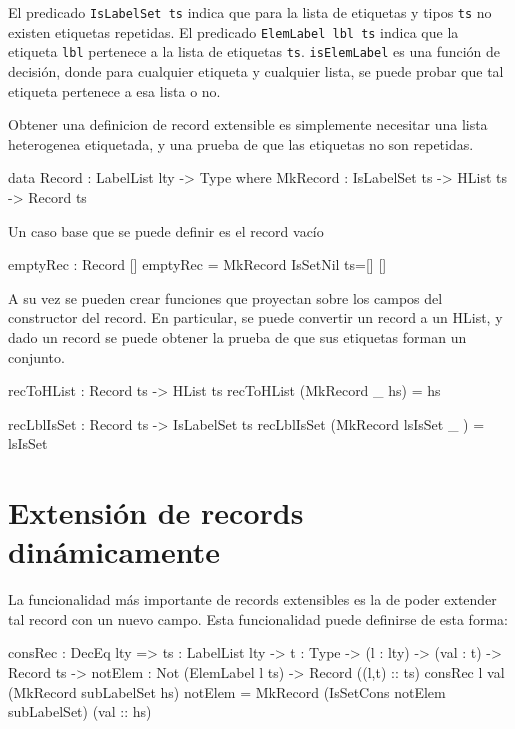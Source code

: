El predicado \texttt{IsLabelSet ts} indica que para la lista de etiquetas y tipos \texttt{ts} no existen etiquetas repetidas.
El predicado \texttt{ElemLabel lbl ts} indica que la etiqueta \texttt{lbl} pertenece a la lista de etiquetas \texttt{ts}.
\texttt{isElemLabel} es una función de decisión, donde para cualquier etiqueta y cualquier lista, se puede probar que tal etiqueta pertenece a esa lista o no.

Obtener una definicion de record extensible es simplemente necesitar una lista heterogenea etiquetada, y una prueba de que las etiquetas no son repetidas.

\begin{code}
data Record : LabelList lty -> Type where
    MkRecord : IsLabelSet ts -> HList ts -> Record ts
\end{code}

Un caso base que se puede definir es el record vacío

\begin{code}
emptyRec : Record []
emptyRec = MkRecord IsSetNil {ts=[]} [] 
\end{code}

A su vez se pueden crear funciones que proyectan sobre los campos del constructor del record. En particular, se puede convertir un record a un HList, y dado un record se puede obtener la prueba de que sus etiquetas forman un conjunto.

\begin{code}
recToHList : Record ts -> HList ts
recToHList (MkRecord _ hs) = hs

recLblIsSet : Record ts -> IsLabelSet ts
recLblIsSet (MkRecord lsIsSet _ ) = lsIsSet  
\end{code}

\section{Extensión de records dinámicamente}

La funcionalidad más importante de records extensibles es la de poder extender tal record con un nuevo campo. Esta funcionalidad puede definirse de esta forma:

\begin{code}
consRec : DecEq lty => {ts : LabelList lty} -> {t : Type} ->
    (l : lty) -> (val : t) ->  Record ts -> 
    {notElem : Not (ElemLabel l ts)} -> Record ((l,t) :: ts)
consRec l val (MkRecord subLabelSet hs) {notElem} = 
    MkRecord (IsSetCons notElem subLabelSet) (val :: hs)
\end{code}

